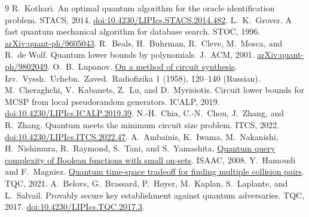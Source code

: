 \documentclass[11pt]{article}
\begin{document}
\begin{thebibliography}{9}
 R.~Kothari. An optimal quantum algorithm for the oracle identification problem. STACS, 2014. \href{https://doi.org/10.4230/LIPIcs.STACS.2014.482}{doi:10.4230/LIPIcs.STACS.2014.482}.
 L.~K.~Grover. A fast quantum mechanical algorithm for database search. STOC, 1996. \href{https://arxiv.org/abs/quant-ph/9605043}{arXiv:quant-ph/9605043}.
 R.~Beals, H.~Buhrman, R.~Cleve, M.~Mosca, and R.~de Wolf. Quantum lower bounds by polynomials. J.~ACM, 2001. \href{https://arxiv.org/abs/quant-ph/9802049}{arXiv:quant-ph/9802049}.
 O.~B.~Lupanov. \href{https://radiophysics.unn.ru/issues/1958/1/120}{On a method of circuit synthesis}. Izv.~Vyssh.~Uchebn.~Zaved.~Radiofizika 1 (1958), 120--140 (Russian).
 M.~Cheraghchi, V.~Kabanets, Z.~Lu, and D.~Myrisiotis. Circuit lower bounds for MCSP from local pseudorandom generators. ICALP, 2019. \href{https://doi.org/10.4230/LIPIcs.ICALP.2019.39}{doi:10.4230/LIPIcs.ICALP.2019.39}.
 N.-H.~Chia, C.-N.~Chou, J.~Zhang, and R.~Zhang. Quantum meets the minimum circuit size problem. ITCS, 2022. \href{https://doi.org/10.4230/LIPIcs.ITCS.2022.47}{doi:10.4230/LIPIcs.ITCS.2022.47}.
 A.~Ambainis, K.~Iwama, M.~Nakanishi, H.~Nishimura, R.~Raymond, S.~Tani, and S.~Yamashita. \href{https://www.kecl.ntt.co.jp/people/tani.seiichiro/pdf/SmallOnSets.pdf}{Quantum query complexity of Boolean functions with small on-sets}. ISAAC, 2008.
 Y.~Hamoudi and F.~Magniez. \href{https://arxiv.org/abs/2002.08944}{Quantum time-space tradeoff for finding multiple collision pairs}. TQC, 2021.
 A.~Belovs, G.~Brassard, P.~H{\o}yer, M.~Kaplan, S.~Laplante, and L.~Salvail. Provably secure key establishment against quantum adversaries. TQC, 2017. \href{https://doi.org/10.4230/LIPIcs.TQC.2017.3}{doi:10.4230/LIPIcs.TQC.2017.3}.
\end{thebibliography}
\end{document}
